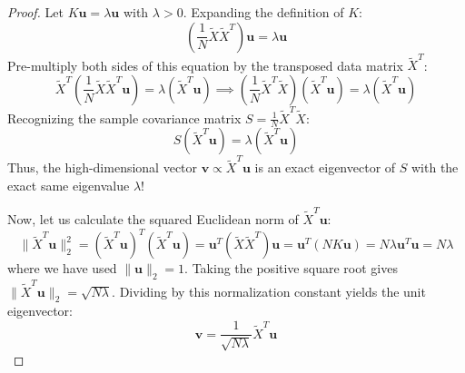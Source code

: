 \begin{proof}
Let $K\mathbf{u} = \lambda \mathbf{u}$ with $\lambda > 0$. Expanding the definition of $K$:
\begin{equation}
\left( \frac{1}{N}\tilde{X}\tilde{X}^T \right) \mathbf{u} = \lambda \mathbf{u}
\end{equation}
Pre-multiply both sides of this equation by the transposed data matrix $\tilde{X}^T$:
\begin{equation}
\tilde{X}^T \left( \frac{1}{N}\tilde{X}\tilde{X}^T \mathbf{u} \right) = \lambda (\tilde{X}^T \mathbf{u}) \implies \left( \frac{1}{N}\tilde{X}^T \tilde{X} \right) (\tilde{X}^T \mathbf{u}) = \lambda (\tilde{X}^T \mathbf{u})
\end{equation}
Recognizing the sample covariance matrix $S = \frac{1}{N}\tilde{X}^T \tilde{X}$:
\begin{equation}
S (\tilde{X}^T \mathbf{u}) = \lambda (\tilde{X}^T \mathbf{u})
\end{equation}
Thus, the high-dimensional vector $\mathbf{v} \propto \tilde{X}^T \mathbf{u}$ is an exact eigenvector of $S$ with the exact same eigenvalue $\lambda$!

Now, let us calculate the squared Euclidean norm of $\tilde{X}^T \mathbf{u}$:
\begin{equation}
\|\tilde{X}^T \mathbf{u}\|_2^2 = (\tilde{X}^T \mathbf{u})^T (\tilde{X}^T \mathbf{u}) = \mathbf{u}^T (\tilde{X}\tilde{X}^T) \mathbf{u} = \mathbf{u}^T (N K \mathbf{u}) = N \lambda \mathbf{u}^T \mathbf{u} = N \lambda
\end{equation}
where we have used $\|\mathbf{u}\|_2 = 1$. Taking the positive square root gives $\|\tilde{X}^T \mathbf{u}\|_2 = \sqrt{N\lambda}$.
Dividing by this normalization constant yields the unit eigenvector:
\begin{equation}
\mathbf{v} = \frac{1}{\sqrt{N\lambda}} \tilde{X}^T \mathbf{u}
\end{equation}
\end{proof}

